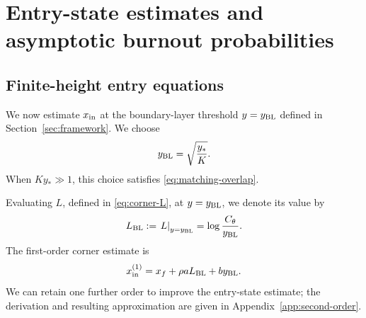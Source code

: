 \documentclass[11pt]{article}
\newcommand{\rhoeps}{\rho}
\newcommand{\xf}{x_f}
\newcommand{\yin}{y_{\rm BL}}
\newcommand{\xin}{x_{\rm in}}
\newcommand{\Cth}{C_\theta}
\begin{document}
\section{Entry-state estimates and asymptotic burnout probabilities}
\label{sec:burnout}
\subsection{Finite-height entry equations}
We now estimate \(\xin\) at the boundary-layer threshold \(y=\yin\) defined in Section~\ref{sec:framework}. We choose
\begin{equation}
\yin=\sqrt{\frac{y_*}{K}}.
\label{eq:ybl}
\end{equation}
When \(Ky_*\gg1\), this choice satisfies \cref{eq:matching-overlap}.

Evaluating \(L\), defined in \cref{eq:corner-L}, at \(y=\yin\), we denote its value by
\begin{equation}
L_{\rm BL}:=\left.L\right|_{y=\yin}=\log\frac{\Cth}{\yin}.
\label{eq:LBLQ}
\end{equation}
The first-order corner estimate is
\begin{equation}
x_{\rm in}^{(1)}=\xf+\rhoeps aL_{\rm BL}+b\yin.
\label{eq:xindir1}
\end{equation}
We can retain one further order to improve the entry-state estimate; the derivation and resulting approximation are given in Appendix~\ref{app:second-order}.
\end{document}
